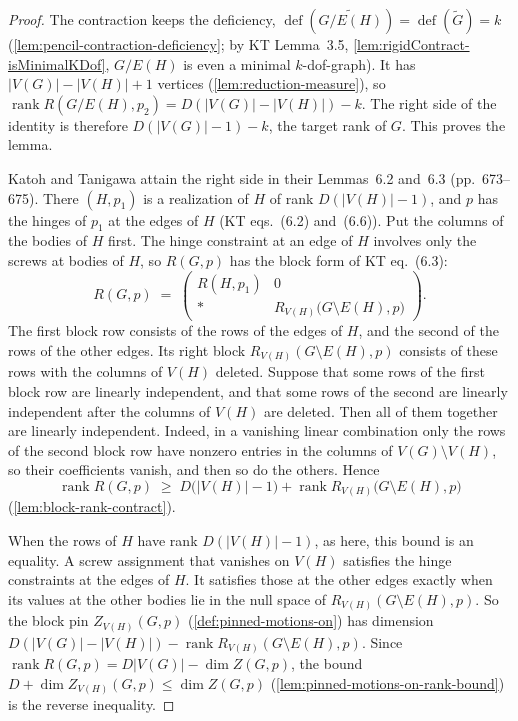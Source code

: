 \begin{proof}
  \leanok
  The contraction keeps the deficiency,
  $\operatorname{def}(\widetilde{G/E(H)}) = \operatorname{def}(\tilde G)
  = k$ (\cref{lem:pencil-contraction-deficiency}; by KT Lemma~3.5,
  \cref{lem:rigidContract-isMinimalKDof}, $G/E(H)$ is even a minimal
  $k$-dof-graph). It has $|V(G)| - |V(H)| + 1$ vertices
  (\cref{lem:reduction-measure}), so
  $\operatorname{rank} R(G/E(H), p_2) = D(|V(G)| - |V(H)|) - k$. The
  right side of the identity is therefore $D(|V(G)| - 1) - k$, the
  target rank of $G$. This proves the lemma.

  Katoh and Tanigawa attain the right side in their Lemmas~6.2 and~6.3
  (pp.~673--675). There $(H, p_1)$ is a realization of $H$ of rank
  $D(|V(H)| - 1)$, and $p$ has the hinges of $p_1$ at the edges of $H$
  (KT eqs.~(6.2) and~(6.6)). Put the columns of the bodies of $H$ first.
  The hinge constraint at an edge of $H$ involves only the screws at
  bodies of $H$, so $R(G,p)$ has the block form of KT eq.~(6.3):
  \[
    R(G,p) \;=\;
    \begin{pmatrix}
      R(H, p_1) & 0 \\
      \ast & R_{V(H)}\bigl(G \setminus E(H), p\bigr)
    \end{pmatrix}.
  \]
  The first block row consists of the rows of the edges of $H$, and the
  second of the rows of the other edges. Its right block
  $R_{V(H)}(G \setminus E(H), p)$ consists of these rows with the
  columns of $V(H)$ deleted. Suppose that some rows of the first block
  row are linearly independent, and that some rows of the second are
  linearly independent after the columns of $V(H)$ are deleted. Then all
  of them together are linearly independent. Indeed, in a vanishing
  linear combination only the rows of the second block row have nonzero
  entries in the columns of $V(G) \setminus V(H)$, so their coefficients
  vanish, and then so do the others. Hence
  \[
    \operatorname{rank} R(G,p) \;\ge\; D\bigl(|V(H)| - 1\bigr)
      + \operatorname{rank} R_{V(H)}\bigl(G \setminus E(H), p\bigr)
  \]
  (\cref{lem:block-rank-contract}).

  When the rows of $H$ have rank $D(|V(H)| - 1)$, as here, this bound is
  an equality. A screw assignment that vanishes on $V(H)$ satisfies the
  hinge constraints at the edges of $H$. It satisfies those at the other
  edges exactly when its values at the other bodies lie in the null space
  of $R_{V(H)}(G \setminus E(H), p)$. So the block pin $Z_{V(H)}(G,p)$
  (\cref{def:pinned-motions-on}) has dimension
  $D(|V(G)| - |V(H)|) - \operatorname{rank} R_{V(H)}(G \setminus E(H), p)$.
  Since $\operatorname{rank} R(G,p) = D|V(G)| - \dim Z(G,p)$, the bound
  $D + \dim Z_{V(H)}(G,p) \le \dim Z(G,p)$
  (\cref{lem:pinned-motions-on-rank-bound}) is the reverse inequality.


\end{proof}

